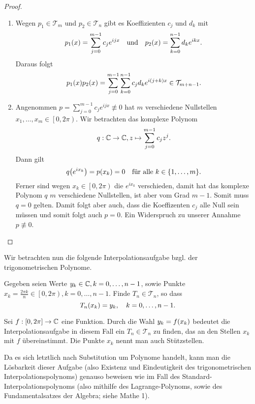 \documentclass{lecture}
\begin{document}
    \begin{proof}
        \begin{enumerate}
            \item Wegen \(p_1 \in \mathcal{T}_m\) und \(p_2 \in \mathcal{T}_n\) gibt es Koeffizienten \(c_j\) und \(d_k\) mit
            \[
                p_1\parentheses*{x} = \sum_{j = 0}^{m - 1}c_j e^{ijx} \quad \text{und} \quad p_2\parentheses*{x} = \sum_{k = 0}^{n - 1}d_k e^{ikx}.
            \]
            Daraus folgt
            \[
                p_1\parentheses*{x}p_2\parentheses*{x} = \sum_{j = 0}^{m - 1}\sum_{k = 0}^{n - 1}c_j d_k e^{i\parentheses*{j + k}x} \in \mathcal{T}_{m + n - 1}.
            \]
            \item Angenommen \(p = \sum_{j = 0}^{m - 1}c_j e^{ijx} \not\equiv 0\) hat \(m\) verschiedene Nullstellen \(x_1, \ldots, x_m \in \left[0, 2\pi\right)\).
            Wir betrachten das komplexe Polynom
            \[
                q: \C \to \C, z \mapsto \sum_{j = 0}^{m - 1}c_j z^j.
            \]
            Dann gilt
            \[
                q\parentheses*{e^{ix_k}} = p\parentheses*{x_k} = 0 \quad \text{für alle }k \in \braces*{1, \ldots, m}.
            \]
            Ferner sind wegen \(x_k \in \left[0, 2\pi\right)\) die \(e^{ix_k}\) verschieden, damit hat das komplexe Polynom \(q\) \(m\) verschiedene Nullstellen, ist aber vom Grad \(m - 1\).
            Somit muss \(q = 0\) gelten.
            Damit folgt aber auch, dass die Koeffizenten \(c_j\) alle Null sein müssen und somit folgt auch \(p = 0\).
            Ein Widerspruch zu unserer Annahme \(p \not\equiv 0\).
        \end{enumerate}
    \end{proof}

    Wir betrachten nun die folgende Interpolationsaufgabe bzgl. der trigonometrischen Polynome.
    \begin{problem}
        Gegeben seien Werte \(y_k \in \C, k = 0, \ldots, n - 1\), sowie Punkte \(x_k = \frac{2\pi k}{n} \in \left[0, 2\pi\right), k = 0, \ldots, n - 1\).
        Finde \(T_n \in \mathcal{T}_n\), so dass
        \[
            T_n\parentheses*{x_k} = y_k, \quad k = 0, \ldots, n - 1.
        \]
    \end{problem}
    \begin{remark}
        Sei \(f: \brackets*{0, 2\pi} \to \C\) eine Funktion.
        Durch die Wahl \(y_k = f\parentheses*{x_k}\) bedeutet die Interpolationsaufgabe in diesem Fall ein \(T_n \in \mathcal{T}_n\) zu finden, das an den Stellen \(x_k\) mit \(f\) übereinstimmt.
        Die Punkte \(x_k\) nennt man auch Stützstellen.
    \end{remark}
    \begin{remark}
        Da es sich letztlich nach Substitution um Polynome handelt, kann man die Lösbarkeit dieser Aufgabe (also Existenz und Eindeutigkeit des trigonometrischen Interpolationspolynoms) genauso beweisen wie im Fall des Standard-Interpolationspolynoms (also mithilfe des Lagrange-Polynoms, sowie des Fundamentalsatzes der Algebra; siehe Mathe 1).
    \end{remark}
\end{document}
